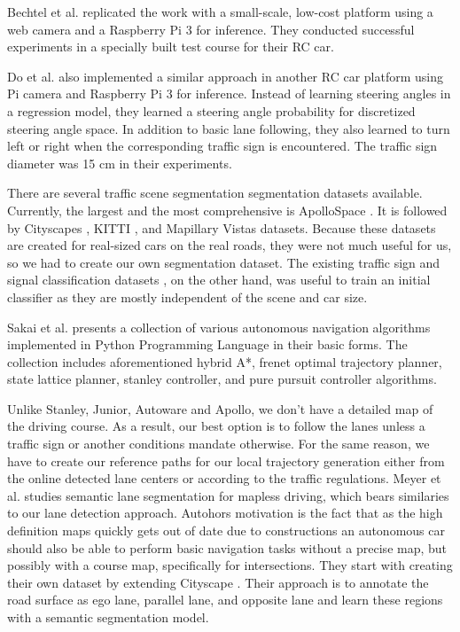 Bechtel et al. \cite{Bechtel2017DeepPicarAL} replicated the work
\cite{Bojarski2016EndTE} with a small-scale, low-cost platform using a web
camera and a Raspberry Pi 3 for inference. They conducted successful
experiments in a specially built test course for their RC car.

Do et al. \cite{Do2018RealTimeSC} also implemented a similar approach in
another RC car platform using Pi camera and Raspberry Pi 3 for inference.
Instead of learning steering angles in a regression model, they learned a
steering angle probability for discretized steering angle space. In addition to
basic lane following, they also learned to turn left or right when the
corresponding traffic sign is encountered. The traffic sign diameter was 15 cm
in their experiments.

There are several traffic scene segmentation segmentation datasets available.
Currently, the largest and the most comprehensive is ApolloSpace
\cite{Huang2018TheAD}. It is followed by Cityscapes \cite{Cordts2016TheCD},
KITTI \cite{Geiger2012AreWR}, and Mapillary Vistas \cite{Neuhold2017TheMV}
datasets. Because these datasets are created for real-sized cars on the real
roads, they were not much useful for us, so we had to create our own
segmentation dataset. The existing traffic sign and signal classification
datasets \cite{Timofte2009MultiviewTS, Stallkamp2012ManVC, Shakhuro2016RussianTS,
Serna2018ClassificationOT, MaldonadoBascn2007RoadSignDA}, on the other hand,
was useful to train an initial classifier as they are mostly independent of the
scene and car size.

Sakai et al. \cite{Kim2013SensorbasedMP} presents a collection of various
autonomous navigation algorithms implemented in Python Programming Language in
their basic forms. The collection includes aforementioned hybrid A*, frenet
optimal trajectory planner, state lattice planner, stanley controller, and pure
pursuit controller algorithms.

Unlike Stanley, Junior, Autoware and Apollo, we don't have a detailed map of
the driving course. As a result, our best option is to follow the lanes unless
a traffic sign or another conditions mandate otherwise. For the same reason, we
have to create our reference paths for our local trajectory generation either
from the online detected lane centers or according to the traffic regulations.
Meyer et al. \cite{Meyer2018DeepSL} studies semantic lane segmentation for
mapless driving, which bears similaries to our lane detection approach.
Autohors motivation is the fact that as the high definition maps quickly gets
out of date due to constructions an autonomous car should also be able to
perform basic navigation tasks without a precise map, but possibly with a
course map, specifically for intersections. They start with creating their own
dataset by extending Cityscape \cite{Cordts2016TheCD}. Their approach is to
annotate the road surface as ego lane, parallel lane, and opposite lane and
learn these regions with a semantic segmentation model.

